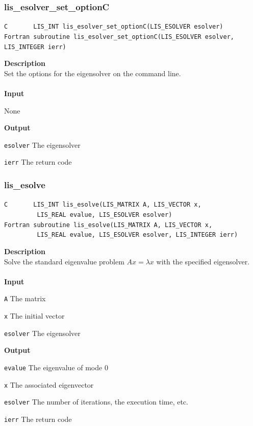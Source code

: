 \documentclass[a4paper]{article}
\newcommand{\namelistlabel}[1]{\mbox{#1}\hfill}
\newenvironment{namelist}[1]{%
\begin{list}{}
  {\let\makelabel\namelistlabel
  \settowidth{\labelwidth}{#1}
  \setlength{\leftmargin}{1.1\labelwidth}}
  }{%
\end{list}}
\begin{document}
\newpage
\subsubsection{lis\_esolver\_set\_optionC}
\begin{screen}
\verb|C       LIS_INT lis_esolver_set_optionC(LIS_ESOLVER esolver)|\\
\verb|Fortran subroutine lis_esolver_set_optionC(LIS_ESOLVER esolver, LIS_INTEGER ierr)|
\end{screen}
{\bf Description}\\
\indent
Set the options for the eigensolver on the command line.
\\ \\
\noindent
{\bf Input}
\begin{namelist}{XXXXXXXXXXXXXXXXXXXX}
\item[None]
\end{namelist}
{\bf Output}
\begin{namelist}{XXXXXXXXXXXXXXXXXXXX}
\item[\tt esolver] The eigensolver
\item[\tt ierr] The return code
\end{namelist}

\newpage
\subsubsection{lis\_esolve}
\begin{screen}
\verb|C       LIS_INT lis_esolve(LIS_MATRIX A, LIS_VECTOR x,|\\ 
\verb|         LIS_REAL evalue, LIS_ESOLVER esolver)|\\
\verb|Fortran subroutine lis_esolve(LIS_MATRIX A, LIS_VECTOR x,|\\
\verb|         LIS_REAL evalue, LIS_ESOLVER esolver, LIS_INTEGER ierr)|
\end{screen}
{\bf Description}\\
\indent
Solve the standard eigenvalue problem $Ax = \lambda x$ with the specified eigensolver.
\\ \\
\noindent
{\bf Input}
\begin{namelist}{XXXXXXXXXXXXXXXXXXXX}
\item[\tt A] The matrix
\item[\tt x] The initial vector
\item[\tt esolver] The eigensolver
\end{namelist}
{\bf Output}
\begin{namelist}{XXXXXXXXXXXXXXXXXXXX}
\item[\tt evalue] The eigenvalue of mode 0
\item[\tt x] The associated eigenvector
\item[\tt esolver] The number of iterations, the execution time, etc.
\item[\tt ierr] The return code
\end{namelist}
\end{document}
